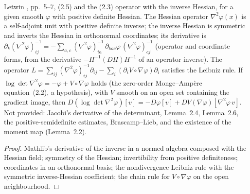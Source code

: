 \begin{lemma}
  \label{lem:letwin-inverse-hessian-derivative}
  \leanok
  Letwin \cite{Letwin2026QuadraticKLS}, pp.~5--7, (2.5) and the (2.3) operator with the inverse
  Hessian, for a given smooth $\varphi$ with positive definite Hessian.  The Hessian operator
  $\nabla^2\varphi(x)$ is a self-adjoint unit with positive definite inverse; the inverse Hessian is
  symmetric and inverts the Hessian in orthonormal coordinates; its derivative is
  $\partial_k(\nabla^2\varphi)^{-1}_{ij}=-\sum_{a,c}(\nabla^2\varphi)^{-1}_{ia}\,\partial_{kac}\varphi\,(\nabla^2\varphi)^{-1}_{cj}$
  (operator and coordinate forms, from the derivative $-H^{-1}(DH)H^{-1}$ of an operator inverse).
  The operator $L=\sum_{ij}(\nabla^2\varphi)^{-1}_{ij}\partial_{ij}-\sum_i(\partial_iV\circ\nabla\varphi)\partial_i$
  satisfies the Leibniz rule.  If $\log\det\nabla^2\varphi=-\varphi+V\circ\nabla\varphi$ holds (the zero-order
  Monge--Amp\`ere equation~(2.2), a hypothesis), with $V$ smooth on an open set containing the gradient
  image, then $D(\log\det\nabla^2\varphi)[v]=-D\varphi[v]+DV(\nabla\varphi)[\nabla^2\varphi\,v]$.  Not
  provided: Jacobi's derivative of the determinant, Lemma~2.4, Lemma~2.6, the positive-semidefinite
  estimates, Brascamp--Lieb, and the existence of the moment map (Lemma~2.2).
\end{lemma}
\begin{proof}
  \leanok
  Mathlib's derivative of the inverse in a normed algebra composed with the Hessian field; symmetry
  of the Hessian; invertibility from positive definiteness; coordinates in an orthonormal basis; the
  nondivergence Leibniz rule with the symmetric inverse-Hessian coefficient; the chain rule for
  $V\circ\nabla\varphi$ on the open neighbourhood.
\end{proof}

